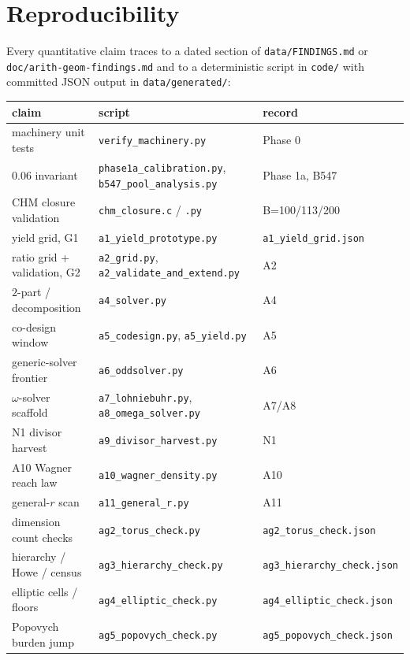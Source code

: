 \documentclass[11pt]{article}
\theoremstyle{remark}
\begin{document}
\section{Reproducibility}\label{app:repro}

Every quantitative claim traces to a dated section of
\texttt{data/FINDINGS.md} or \texttt{doc/arith-geom-findings.md} and to a
deterministic script in \texttt{code/} with committed JSON output in
\texttt{data/generated/}:

\begin{center}\small
\begin{tabular}{@{}lll@{}}
\toprule
claim & script & record \\
\midrule
machinery unit tests & \texttt{verify\_machinery.py} & Phase 0 \\
$0.06$ invariant & \texttt{phase1a\_calibration.py},
\texttt{b547\_pool\_analysis.py} & Phase 1a, B547 \\
CHM closure validation & \texttt{chm\_closure.c} / \texttt{.py} & B=100/113/200 \\
yield grid, G1 & \texttt{a1\_yield\_prototype.py} &
\texttt{a1\_yield\_grid.json} \\
ratio grid + validation, G2 & \texttt{a2\_grid.py},
\texttt{a2\_validate\_and\_extend.py} & A2 \\
$2$-part / decomposition & \texttt{a4\_solver.py} & A4 \\
co-design window & \texttt{a5\_codesign.py}, \texttt{a5\_yield.py} & A5 \\
generic-solver frontier & \texttt{a6\_oddsolver.py} & A6 \\
$\omega$-solver scaffold & \texttt{a7\_lohniebuhr.py},
\texttt{a8\_omega\_solver.py} & A7/A8 \\
N1 divisor harvest & \texttt{a9\_divisor\_harvest.py} & N1 \\
A10 Wagner reach law & \texttt{a10\_wagner\_density.py} & A10 \\
general-$r$ scan & \texttt{a11\_general\_r.py} & A11 \\
dimension count checks & \texttt{ag2\_torus\_check.py} &
\texttt{ag2\_torus\_check.json} \\
hierarchy / Howe / census & \texttt{ag3\_hierarchy\_check.py} &
\texttt{ag3\_hierarchy\_check.json} \\
elliptic cells / floors & \texttt{ag4\_elliptic\_check.py} &
\texttt{ag4\_elliptic\_check.json} \\
Popovych burden jump & \texttt{ag5\_popovych\_check.py} &
\texttt{ag5\_popovych\_check.json} \\
\bottomrule
\end{tabular}
\end{center}
\end{document}
